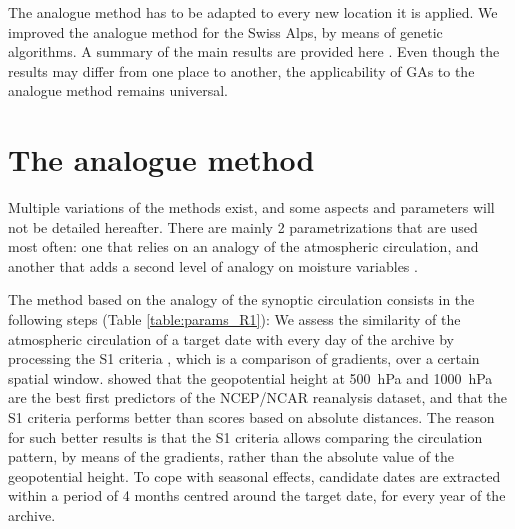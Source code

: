 \documentclass[5p]{elsarticle}
\begin{document}
The analogue method has to be adapted to every new location it is applied. We improved the analogue method for the Swiss Alps, by means of genetic algorithms. A summary of the main results are provided here \citep[see][for the details]{Horton2012a}. Even though the results may differ from one place to another, the applicability of GAs to the analogue method remains universal.



\section{The analogue method}
\label{section_analog_method}

Multiple variations of the methods exist, and some aspects and parameters will not be detailed hereafter. There are mainly 2 parametrizations that are used most often: one that relies on an analogy of the atmospheric circulation, and another that adds a second level of analogy on moisture variables \citep{Obled2002, Bontron2005, Marty2012}.

The method based on the analogy of the synoptic circulation consists in the following steps (Table \ref{table:params_R1}): We assess the similarity of the atmospheric circulation of a target date with every day of the archive by processing the S1 criteria \citep[Eq.\ (\ref{eq:S1}), ][]{Teweles1954, Drosdowsky2003}, which is a comparison of gradients, over a certain spatial window. \citet{Bontron2005} showed that the geopotential height at 500~hPa and 1000~hPa are the best first predictors of the NCEP/NCAR reanalysis dataset, and that the S1 criteria performs better than scores based on absolute distances. The reason for such better results is that the S1 criteria allows comparing the circulation pattern, by means of the gradients, rather than the absolute value of the geopotential height. To cope with seasonal effects, candidate dates are extracted within a period of 4 months centred around the target date, for every year of the archive.
\end{document}
